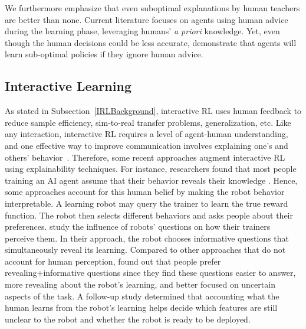 \documentclass[twoside,11pt]{article}
\begin{document}
We furthermore emphasize that even suboptimal explanations by human teachers are better than none. Current literature focuses on agents using human advice during the learning phase, leveraging humans' \emph{a priori} knowledge. Yet, even though the human decisions could be less accurate, \citet{Zhang:2020:human_out_loop} demonstrate that agents will learn sub-optimal policies if they ignore human advice. 

\subsection{Interactive Learning}
As stated in Subsection~\ref{IRLBackground}, interactive RL uses human feedback to reduce sample efficiency, sim-to-real transfer problems, generalization, etc. Like any interaction, interactive RL requires a level of agent-human understanding, and one effective way to improve communication involves explaining one's and others' behavior~\citep{de:17}. Therefore, some recent approaches augment interactive RL using explainability techniques. For instance, researchers found that most people training an AI agent assume that their behavior reveals their knowledge \citep{habibian:21}. Hence, some approaches account for this human belief by making the robot behavior interpretable. A learning robot may query the trainer to learn the true reward function. The robot then selects different behaviors and asks people about their preferences. \citet{habibian:21} study the influence of robots' questions on how their trainers perceive them. In their approach, the robot chooses informative questions that simultaneously reveal its learning. Compared to other approaches that do not account for human perception, \citet{habibian:21} found out that people prefer revealing+informative questions since they find these questions easier to answer, more revealing about the robot's learning, and better focused on uncertain aspects of the task. A follow-up study determined that accounting what the human learns from the robot's learning helps decide which features are still unclear to the robot and whether the robot is ready to be deployed. 
\end{document}

